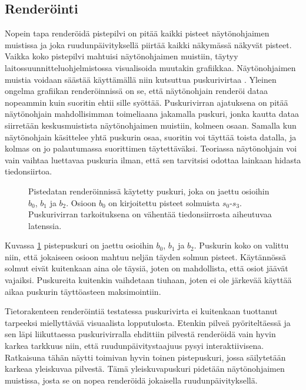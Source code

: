 \subsection{Renderöinti}\label{render}

Nopein tapa renderöidä pistepilvi on pitää kaikki pisteet näytönohjaimen muistissa ja joka ruudunpäivityksellä piirtää kaikki näkymässä näkyvät pisteet. Vaikka koko pistepilvi mahtuisi näytönohjaimen muistiin, täytyy laitossuunnitteluohjelmistossa visualisoida muutakin grafiikkaa. Näytönohjaimen muistia voidaan säästää käyttämällä niin kutsuttua puskurivirtaa . Yleinen ongelma grafiikan renderöinnissä on se, että näytönohjain renderöi dataa nopeammin kuin suoritin ehtii sille syöttää. Puskurivirran ajatuksena on pitää näytönohjain mahdollisimman toimeliaana jakamalla puskuri, jonka kautta dataa siirretään keskusmuistista näytönohjaimen muistiin, kolmeen osaan. Samalla kun näytönohjain käsittelee yhtä puskurin osaa, suoritin voi täyttää toista datalla, ja kolmas on jo palautumassa suorittimen täytettäväksi. Teoriassa näytönohjain voi vain vaihtaa luettavaa puskuria ilman, että sen tarvitsisi odottaa lainkaan hidasta tiedonsiirtoa. \cite{opengl}

\begin{figure}
    \centering
    
    \caption{Pistedatan renderöinnissä käytetty puskuri, joka on jaettu osioihin $b_0$, $b_1$ ja $b_2$. Osioon $b_0$ on kirjoitettu pisteet solmuista $s_0$-$s_3$. Puskurivirran tarkoituksena on vähentää tiedonsiirrosta aiheutuvaa latenssia.}
    \label{triplebuffering}
\end{figure}

Kuvassa \ref{triplebuffering} pistepuskuri on jaettu osioihin $b_0$, $b_1$ ja $b_2$. Puskurin koko on valittu niin, että jokaiseen osioon mahtuu neljän täyden solmun pisteet. Käytännössä solmut eivät kuitenkaan aina ole täysiä, joten on mahdollista, että osiot jäävät vajaiksi. Puskureita kuitenkin vaihdetaan tiuhaan, joten ei ole järkevää käyttää aikaa puskurin täyttöasteen maksimointiin.

Tietorakenteen renderöintiä testatessa puskurivirta ei kuitenkaan tuottanut tarpeeksi miellyttävää visuaalista lopputulosta. Etenkin pilveä pyöriteltäessä ja sen läpi liikuttaessa puskurivirralla ehdittiin pilvestä renderöidä vain hyvin karkea tarkkuus niin, että ruudunpäivitystaajuus pysyi interaktiivisena. Ratkaisuna tähän näytti toimivan hyvin toinen pistepuskuri, jossa säilytetään karkeaa yleiskuvaa pilvestä. Tämä yleiskuvapuskuri pidetään näytönohjaimen muistissa, josta se on nopea renderöidä jokaisella ruudunpäivityksellä. 

